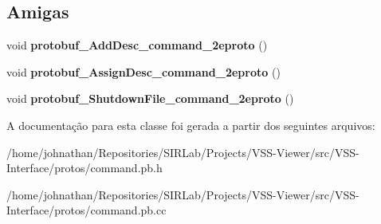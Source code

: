 \subsection*{Amigas}
\begin{DoxyCompactItemize}
\item 
void {\bfseries protobuf\+\_\+\+Add\+Desc\+\_\+command\+\_\+2eproto} ()\hypertarget{classvss__command_1_1Global__Commands_a4825d92f856fcb4b02c67b601c433796}{}\label{classvss__command_1_1Global__Commands_a4825d92f856fcb4b02c67b601c433796}

\item 
void {\bfseries protobuf\+\_\+\+Assign\+Desc\+\_\+command\+\_\+2eproto} ()\hypertarget{classvss__command_1_1Global__Commands_a4c6fb97c25079d49daf010087d869100}{}\label{classvss__command_1_1Global__Commands_a4c6fb97c25079d49daf010087d869100}

\item 
void {\bfseries protobuf\+\_\+\+Shutdown\+File\+\_\+command\+\_\+2eproto} ()\hypertarget{classvss__command_1_1Global__Commands_a4cf10633ad46690f5eec6bdbbcf62de0}{}\label{classvss__command_1_1Global__Commands_a4cf10633ad46690f5eec6bdbbcf62de0}

\end{DoxyCompactItemize}


A documentação para esta classe foi gerada a partir dos seguintes arquivos\+:\begin{DoxyCompactItemize}
\item 
/home/johnathan/\+Repositories/\+S\+I\+R\+Lab/\+Projects/\+V\+S\+S-\/\+Viewer/src/\+V\+S\+S-\/\+Interface/protos/command.\+pb.\+h\item 
/home/johnathan/\+Repositories/\+S\+I\+R\+Lab/\+Projects/\+V\+S\+S-\/\+Viewer/src/\+V\+S\+S-\/\+Interface/protos/command.\+pb.\+cc\end{DoxyCompactItemize}
